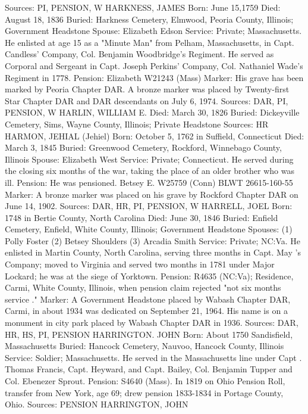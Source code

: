 Sources: PI, PENSION, W 
HARKNESS, JAMES 
Born: June 15,1759 
Died: August 18, 1836 
Buried: Harkness Cemetery, Elmwood, Peoria County, Illinois; Government Headstone
Spouse: Elizabeth Edson 
Service: Private; Massachusetts. He enlisted at age 15 as a "Minute Man" from Pelham, Massachusetts, in Capt. Candless' Company, Col. Benjamin Wood­bridge's Regiment. He served as Corporal and Sergeant in Capt. Joseph Perkins' Company, Col. Nathaniel Wade's Regiment in 1778. 
Pension: Elizabeth W21243 (Mass) Marker: His grave has been marked by Peoria Chapter DAR. A bronze marker was placed by Twenty-first Star Chapter DAR and DAR descendants on July 6, 1974. 
Sources: DAR, PI, PENSION, W 
HARLIN, WILLIAM E. 
Died: March 30, 1826 
Buried: Dickeyville Cemetery, Sims, Wayne County, Illinois; Private Headstone Sources: HR 
HARMON, JEHIAL (Jehiel) 
Born: October 5, 1762 in Suffield, Connecticut 
Died: March 3, 1845 
Buried: Greenwood Cemetery, Rockford, Winnebago County, Illinois 
Spouse: Elizabeth West 
Service: Private; Connecticut. He served during the closing six months of the war, taking the place of an older brother who was ill. 
Pension: He was pensioned. Betsey E. W25759 (Conn) BLWT 26615-160-55 
Marker: A bronze marker was placed on his grave by Rockford Chapter DAR on June 14, 1902. 
Sources: DAR, HR, PI, PENSION, W 
HARRELL, JOEL 
Born: 1748 in Bertie County, North Carolina 
Died: June 30, 1846 
Buried: Enfield Cemetery, Enfield, White County, Illinois; Government Headstone 
Spouses: (1) Polly Foster 
	 (2) Betsey Shoulders 
	 (3) Arcadia Smith 
Service: Private; NC:Va. He enlisted in Martin County, North Carolina, serving three months in Capt. May 's Company; moved to Virginia and served two months in 1781 under Major Lockard; he was at the siege of Yorktown. 
Pension: R4635 (NC:Va); Residence, Carmi, White County, Illinois, when pension claim rejected "not six months service ." 
Marker: A Government Headstone placed by Wabash Chapter DAR, Carmi, in about 1934 was dedicated on September 21, 1964. His name is on a monument in city park placed by Wabash Chapter DAR in 1936. 
Sources: DAR, HR, HS, PI, PENSION 
HARRINGTON. JOHN 
Born: About 1750 Sandisfield, Massachusetts 
Buried: Hancock Cemetery, Nauvoo, Hancock County, Illinois Service: Soldier; Massachusetts. He served in the Massachusetts line under Capt . Thomas Francis, Capt. Heyward, and Capt. Bailey, Col. Benjamin Tupper and Col. Ebenezer Sprout. Pension: S4640 (Mass). In 1819 on Ohio Pension Roll, transfer from New York, age 69; drew pension 1833-1834 in Portage County, Ohio. 
Sources: PENSION 
HARRINGTON, JOHN 
